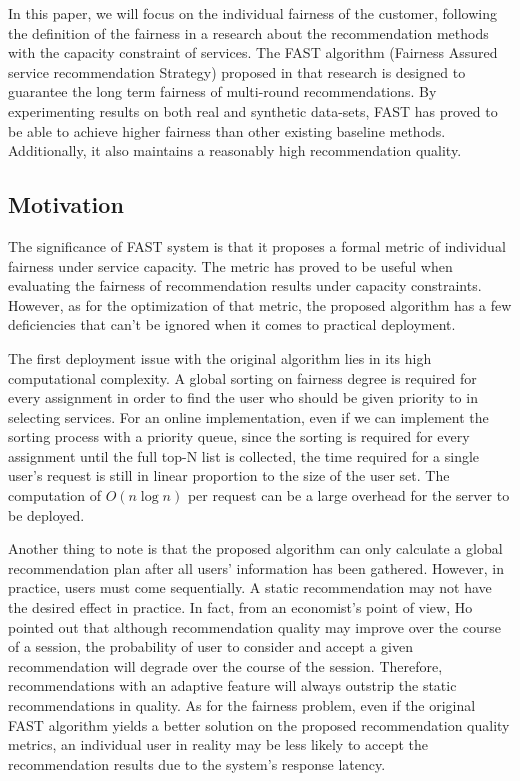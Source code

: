 

In this paper, we will focus on the individual fairness of the customer, following the definition of the fairness in a research \cite{FAST} about the recommendation methods with the capacity constraint of services. The FAST algorithm (Fairness Assured service recommendation Strategy) proposed in that research is designed to guarantee the long term fairness of multi-round recommendations. By experimenting results on both real and synthetic data-sets, FAST has proved to be able to achieve higher fairness than other existing baseline methods. Additionally, it also maintains a reasonably high recommendation quality. 


\subsection{Motivation}
\label{section:motivation}
The significance of FAST system is that it proposes a formal metric of individual fairness under service capacity. The metric has proved to be useful when evaluating the fairness of recommendation results under capacity constraints. However, as for the optimization of that metric, the proposed algorithm has a few deficiencies that can't be ignored when it comes to practical deployment. 


The first deployment issue with the original algorithm lies in its high computational complexity. A global sorting on fairness degree is required for every assignment in order to find the user who should be given priority to in selecting services. For an online implementation, even if we can implement the sorting process with a priority queue, since the sorting is required for every assignment until the full top-N list is collected, the time required for a single user's request is still in linear proportion to the size of the user set. The computation of $O(n\log n)$ per request can be a large overhead for the server to be deployed.

Another thing to note is that the proposed algorithm can only calculate a global recommendation plan after all users' information has been gathered. However, in practice, users must come sequentially. A static recommendation may not have the desired effect in practice. In fact, from an economist's point of view, Ho\cite{adaptive_recommendation} pointed out that although recommendation quality may improve over the course of a session, the probability of user to consider and accept a given recommendation will degrade over the course of the session. Therefore, recommendations with an adaptive feature will always outstrip the static recommendations in quality. As for the fairness problem, even if the original FAST algorithm yields a better solution on the proposed recommendation quality metrics, an individual user in reality may be less likely to accept the recommendation results due to the system's response latency.


